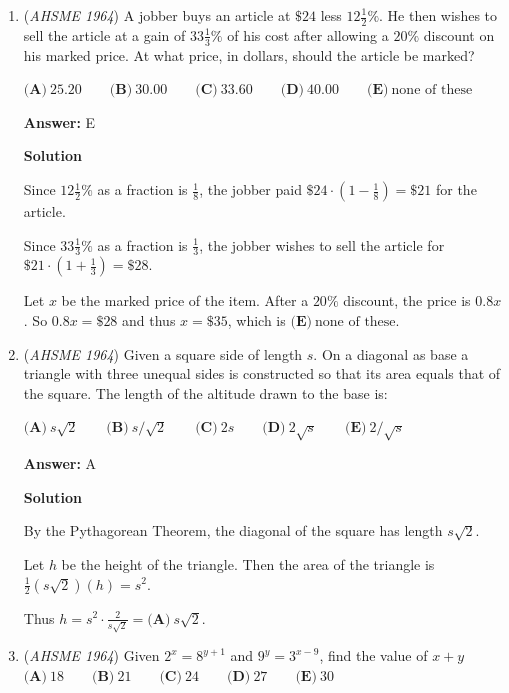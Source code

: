 \begin{enumerate}
	\item (\textit{AHSME 1964}) A jobber buys an article at $\$24$ less $12\frac{1}{2}\%$. He then wishes to sell the article at a gain of $33\frac{1}{3}\%$ of his cost 
after allowing a $20\%$ discount on his marked price. At what price, in dollars, should the article be marked?


 $\textbf{(A)}\ 25.20 \qquad \textbf{(B)}\ 30.00 \qquad \textbf{(C)}\ 33.60 \qquad \textbf{(D)}\ 40.00 \qquad \textbf{(E)}\ \text{none of these}$

 \textbf{Answer: }E



\textbf{Solution}

Since $12\frac{1}{2}\%$ as a fraction is $\frac{1}{8}$, the jobber paid $\$24 \cdot \left(1 - \frac{1}{8}\right) = \$21$ for the article.

 Since $33\frac{1}{3}\%$ as a fraction is $\frac{1}{3}$, the jobber wishes to sell the article for $\$21 \cdot \left(1 + \frac{1}{3}\right) = \$28$.

 Let $x$ be the marked price of the item.  After a $20\%$ discount, the price is $0.8x$.  So $0.8x = \$28$ and thus $x = \$35$, which is $\boxed{\textbf{(E)}\ \text{none of these}}$.

 


	\item (\textit{AHSME 1964}) Given a square side of length $s$. On a diagonal as base a triangle with three unequal sides is constructed so that its area
equals that of the square. The length of the altitude drawn to the base is:


 $\textbf{(A)}\ s\sqrt{2} \qquad \textbf{(B)}\ s/\sqrt{2} \qquad \textbf{(C)}\ 2s \qquad \textbf{(D)}\ 2\sqrt{s} \qquad \textbf{(E)}\ 2/\sqrt{s}$

 \textbf{Answer: }A



\textbf{Solution}

By the Pythagorean Theorem, the diagonal of the square has length $s\sqrt{2}$.

 Let $h$ be the height of the triangle.  Then the area of the triangle is $\frac{1}{2}(s\sqrt{2})(h) = s^2$.

 Thus $h = s^2 \cdot \frac{2}{s\sqrt{2}} = \boxed{\textbf{(A)}\ s\sqrt{2}}$.

 


	\item (\textit{AHSME 1964}) Given $2^x=8^{y+1}$ and $9^y=3^{x-9}$, find the value of $x+y$
$\textbf{(A)}\ 18 \qquad \textbf{(B)}\ 21 \qquad \textbf{(C)}\ 24 \qquad \textbf{(D)}\ 27 \qquad \textbf{(E)}\ 30$


\end{enumerate}
